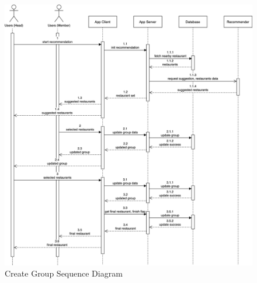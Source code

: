 \documentclass[12pt,oneside,openright,a4paper]{cpe-english-project}
\begin{document}
\begin{figure}[H]\centering
\includegraphics[width=400pt]{./images/3seqdiagram_grouprec.png}
\caption{Create Group Sequence Diagram}\label{fig:3seqdiagram_grouprec}
\end{figure}\vspace{-24pt}
\end{document}
